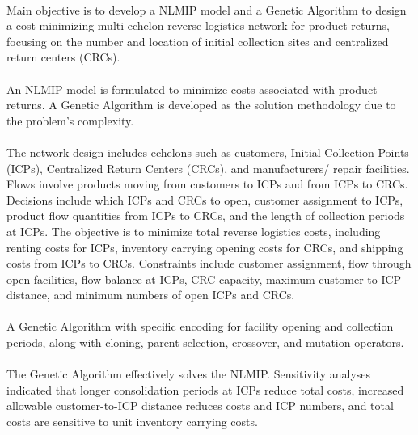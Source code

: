 \paragraph{} Main objective is to develop a NLMIP model and a Genetic Algorithm to design a cost-minimizing multi-echelon reverse logistics network for product returns, focusing on the number and location of initial collection sites and centralized return centers (CRCs).

\paragraph{} An NLMIP model is formulated to minimize costs associated with product returns. A Genetic Algorithm is developed as the solution methodology due to the problem's complexity.

\paragraph{} The network design includes echelons such as customers, Initial Collection Points (ICPs), Centralized Return Centers (CRCs), and manufacturers/ repair facilities. Flows involve products moving from customers to ICPs and from ICPs to CRCs. Decisions include which ICPs and CRCs to open, customer assignment to ICPs, product flow quantities from ICPs to CRCs, and the length of collection periods at ICPs. The objective is to minimize total reverse logistics costs, including renting costs for ICPs, inventory carrying opening costs for CRCs, and shipping costs from ICPs to CRCs. Constraints include customer assignment, flow through open facilities, flow balance at ICPs, CRC capacity, maximum customer to ICP distance, and minimum numbers of open ICPs and CRCs.

\paragraph{} A Genetic Algorithm with specific encoding for facility opening and collection periods, along with cloning, parent selection, crossover, and mutation operators.

\paragraph{} The Genetic Algorithm effectively solves the NLMIP. Sensitivity analyses indicated that longer consolidation periods at ICPs reduce total costs, increased allowable customer-to-ICP distance reduces costs and ICP numbers, and total costs are sensitive to unit inventory carrying costs.

